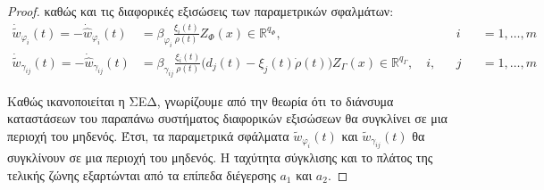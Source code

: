 \begin{proof}
καθώς και τις διαφορικές εξισώσεις των παραμετρικών σφαλμάτων:
\begin{equation*}
\begin{alignedat}{3}
\dot{\tilde{w}}_{\varphi_i}(t) = - \dot{\hat{w}}_{\varphi_i}(t) &= 
\beta_{\varphi_i} \frac{\xi_i(t)}{\rho(t)} Z_{\Phi}(x) 
\in \mathbb{R}^{q_{\Phi}}, \quad &&i &&= 1,\dots,m \\
\dot{\tilde{w}}_{\gamma_{ij}}(t) = - \dot{\hat{w}}_{\gamma_{ij}}(t) &= \beta_{\gamma_{ij}} \frac{\xi_i(t)}{\rho(t)}
\big( d_j(t) - \xi_j(t) \dot{\rho}(t) \big) Z_{\Gamma}(x)
\in \mathbb{R}^{q_{\Gamma}},
\quad i,&&j &&= 1,\dots,m
\end{alignedat}
\end{equation*}

Καθώς ικανοποιείται η ΣΕΔ, γνωρίζουμε από την θεωρία ότι το διάνσυμα καταστάσεων του παραπάνω συστήματος διαφορικών εξισώσεων θα συγκλίνει σε μια περιοχή του μηδενός. Έτσι, τα παραμετρικά σφάλματα  $\tilde{w}_{\varphi_i}(t)$ και $\tilde{w}_{\gamma_{ij}}(t)$ θα συγκλίνουν σε μια περιοχή του μηδενός. Η ταχύτητα σύγκλισης και το πλάτος της τελικής ζώνης εξαρτώνται από τα επίπεδα διέγερσης $a_1$ και $a_2$.

\end{proof}




